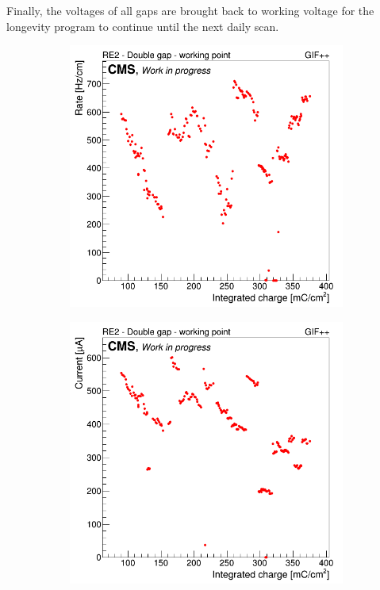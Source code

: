 	Finally, the voltages of all gaps are brought back to working voltage for the longevity program to continue until the next daily scan. 
	
	\begin{figure}[H]
    	\begin{subfigure}{0.5\linewidth}
			\centering
    		\includegraphics[width = 0.5\plotwidth]{fig/chapt5/GIFpp-Rate-vs-Q.png}
        	\caption{\label{fig:rate-I-monitor:A}}
    	\end{subfigure}
    	\begin{subfigure}{0.5\linewidth}
			\centering
    		\includegraphics[width = 0.5\plotwidth]{fig/chapt5/GIFpp-I-vs-Q.png}

\end{subfigure}
\end{figure}
